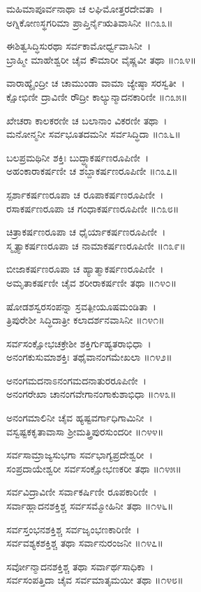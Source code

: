 ಮಹಿಮಾಪೂರ್ವನಾಥಾ ಚ ಲಘಿಮೋತ್ತರದೇವತಾ~।\\
ಅಗ್ನಿಕೋಣಸ್ಥಗರಿಮಾ ಪ್ರಾಪ್ತಿರ್ನೈಋತಿವಾಸಿನೀ ॥೧೩೩॥

	ಈಶಿತ್ವಸಿದ್ಧಿಸುರಥಾ ಸರ್ವಕಾಮೋರ್ಧ್ವವಾಸಿನೀ~।\\
	ಬ್ರಾಹ್ಮೀ ಮಾಹೇಶ್ವರೀ ಚೈವ ಕೌಮಾರೀ ವೈಷ್ಣವೀ ತಥಾ ॥೧೩೪॥

ವಾರಾಹ್ಯೈಂದ್ರೀ ಚ ಚಾಮುಂಡಾ ವಾಮಾ ಜ್ಯೇಷ್ಠಾ ಸರಸ್ವತೀ~।\\
ಕ್ಷೋಭಿಣೀ ದ್ರಾವಿಣೀ ರೌದ್ರೀ ಕಾಲ್ಯುನ್ಮಾದನಕಾರಿಣೀ ॥೧೩೫॥

	ಖೇಚರಾ ಕಾಲಕರಣೀ ಚ ಬಲಾನಾಂ ವಿಕರಣೀ ತಥಾ~।\\
	ಮನೋನ್ಮನೀ ಸರ್ವಭೂತದಮನೀ ಸರ್ವಸಿದ್ಧಿದಾ ॥೧೩೬॥

ಬಲಪ್ರಮಥಿನೀ ಶಕ್ತಿಃ ಬುದ್ಧ್ಯಾಕರ್ಷಣರೂಪಿಣೀ~।\\
ಅಹಂಕಾರಾಕರ್ಷಣೀ ಚ ಶಬ್ದಾಕರ್ಷಣರೂಪಿಣೀ ॥೧೩೭॥

	ಸ್ಪರ್ಶಾಕರ್ಷಣರೂಪಾ ಚ ರೂಪಾಕರ್ಷಣರೂಪಿಣೀ~।\\
	ರಸಾಕರ್ಷಣರೂಪಾ ಚ ಗಂಧಾಕರ್ಷಣರೂಪಿಣೀ ॥೧೩೮॥

ಚಿತ್ರಾಕರ್ಷಣರೂಪಾ ಚ ಧೈರ್ಯಾಕರ್ಷಣರೂಪಿಣೀ~।\\
ಸ್ಮೃತ್ಯಾಕರ್ಷಣರೂಪಾ ಚ ನಾಮಾಕರ್ಷಣರೂಪಿಣೀ ॥೧೩೯॥

	ಬೀಜಾಕರ್ಷಣರೂಪಾ ಚ ಹ್ಯಾತ್ಮಾಕರ್ಷಣರೂಪಿಣೀ~।\\
	ಅಮೃತಾಕರ್ಷಣೀ ಚೈವ ಶರೀರಾಕರ್ಷಣೀ ತಥಾ ॥೧೪೦॥

ಷೋಡಶಸ್ವರಸಂಪನ್ನಾ ಸ್ರವತ್ಪೀಯೂಷಮಂಡಿತಾ~।\\
ತ್ರಿಪುರೇಶೀ ಸಿದ್ಧಿದಾತ್ರೀ ಕಲಾದರ್ಶನವಾಸಿನೀ ॥೧೪೧॥

	ಸರ್ವಸಂಕ್ಷೋಭಚಕ್ರೇಶೀ ಶಕ್ತಿರ್ಗುಹ್ಯತರಾಭಿಧಾ~।\\
	ಅನಂಗಕುಸುಮಾಶಕ್ತಿಃ ತಥೈವಾನಂಗಮೇಖಲಾ ॥೧೪೨॥

ಅನಂಗಮದನಾಽನಂಗಮದನಾತುರರೂಪಿಣೀ~।\\
ಅನಂಗರೇಖಾ ಚಾನಂಗವೇಗಾನಂಗಾಕುಶಾಭಿಧಾ ॥೧೪೩॥

	ಅನಂಗಮಾಲಿನೀ ಚೈವ ಹ್ಯಷ್ಟವರ್ಗಾಧಿಗಾಮಿನೀ~।\\
	ವಸ್ವಷ್ಟಕಕೃತಾವಾಸಾ ಶ್ರೀಮತ್ತ್ರಿಪುರಸುಂದರೀ ॥೧೪೪॥

ಸರ್ವಸಾಮ್ರಾಜ್ಯಸುಭಗಾ ಸರ್ವಭಾಗ್ಯಪ್ರದೇಶ್ವರೀ~।\\
ಸಂಪ್ರದಾಯೇಶ್ವರೀ ಸರ್ವಸಂಕ್ಷೋಭಣಕರೀ ತಥಾ ॥೧೪೫॥

	ಸರ್ವವಿದ್ರಾವಿಣೀ ಸರ್ವಾಕರ್ಷಿಣೀ ರೂಪಕಾರಿಣೀ~।\\
	ಸರ್ವಾಹ್ಲಾದನಶಕ್ತಿಶ್ಚ ಸರ್ವಸಮ್ಮೋಹಿನೀ ತಥಾ ॥೧೪೬॥

ಸರ್ವಸ್ತಂಭನಶಕ್ತಿಶ್ಚ ಸರ್ವಜೃಂಭಣಕಾರಿಣೀ~।\\
ಸರ್ವವಶ್ಯಕಶಕ್ತಿಶ್ಚ ತಥಾ ಸರ್ವಾನುರಂಜನೀ ॥೧೪೭॥

	ಸರ್ವೋನ್ಮಾದನಶಕ್ತಿಶ್ಚ ತಥಾ ಸರ್ವಾರ್ಥಸಾಧಿಕಾ~।\\
	ಸರ್ವಸಂಪತ್ತಿದಾ ಚೈವ ಸರ್ವಮಾತೃಮಯೀ ತಥಾ ॥೧೪೮॥

